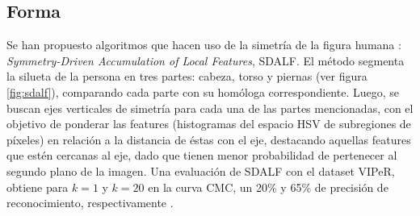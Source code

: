 \documentclass[../memoria.tex]{subfiles}
\begin{document}
\subsection{Forma}
\indent Se han propuesto algoritmos que hacen uso de la simetría de la figura humana \cite{farenzena2010person}: \emph{Symmetry-Driven Accumulation of Local Features}, SDALF. El método segmenta la silueta de la persona en tres partes: cabeza, torso y piernas (ver figura \ref{fig:sdalf}), comparando cada parte con su homóloga correspondiente. Luego, se buscan ejes verticales de simetría para cada una de las partes mencionadas, con el objetivo de ponderar las features (histogramas del espacio HSV de subregiones de píxeles) en relación a la distancia de éstas con el eje, destacando aquellas features que estén cercanas al eje, dado que tienen menor probabilidad de pertenecer al segundo plano de la imagen. Una evaluación de SDALF con el dataset VIPeR, obtiene para $k=1$ y $k=20$ en la curva CMC, un 20\% y 65\% de precisión de reconocimiento, respectivamente \cite{farenzena2010person}. %
\end{document}
